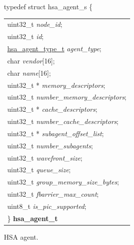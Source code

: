 \documentclass[final]{book}
\newcommand{\reffld}[1]{\textit{#1}}
\begin{document}
\noindent\begin{tcolorbox}[breakable,nobeforeafter,arc=0mm,colframe=white,colback=lightgray,left=0mm]
typedef struct  hsa_agent_s \{
\vspace{-3.5mm}\begin{longtable}{@{}p{\textwidth}}
\hspace{1.7em}uint32_t \reffld{node_id};\\
\hspace{1.7em}uint32_t \reffld{id};\\
\hspace{1.7em}\hyperlink{group__topology_1ga2e7880ed1215a49400af0a0039771876}{hsa_agent_type_t} \reffld{agent_type};\\
\hspace{1.7em}char \reffld{vendor}[16];\\
\hspace{1.7em}char \reffld{name}[16];\\
\hspace{1.7em}uint32_t * \reffld{memory_descriptors};\\
\hspace{1.7em}uint32_t \reffld{number_memory_descriptors};\\
\hspace{1.7em}uint32_t * \reffld{cache_descriptors};\\
\hspace{1.7em}uint32_t \reffld{number_cache_descriptors};\\
\hspace{1.7em}uint32_t * \reffld{subagent_offset_list};\\
\hspace{1.7em}uint32_t \reffld{number_subagents};\\
\hspace{1.7em}uint32_t \reffld{wavefront_size};\\
\hspace{1.7em}uint32_t \reffld{queue_size};\\
\hspace{1.7em}uint32_t \reffld{group_memory_size_bytes};\\
\hspace{1.7em}uint32_t \reffld{fbarrier_max_count};\\
\hspace{1.7em}uint8_t \reffld{is_pic_supported};\\
\}  \hypertarget{group__topology_1gab8db3fb886332a24acac08ec361e1d86}{\textbf{hsa_agent_t}}
\end{longtable}

\end{tcolorbox}
HSA agent.
\end{document}
